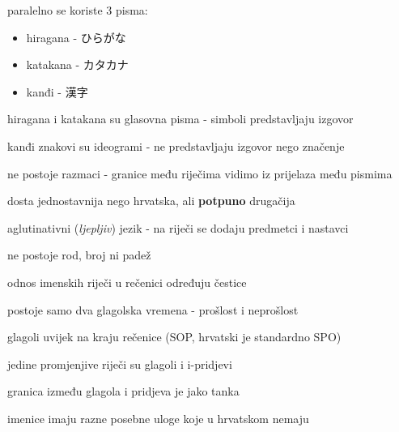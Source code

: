 	\begin{hyou}
		\item paralelno se koriste 3 pisma:
		\begin{itemize}
			\itemsep-5pt
			\item hiragana - ひらがな
			\item katakana - カタカナ
			\item kanđi - 漢字
		\end{itemize}
		\item hiragana i katakana su glasovna pisma - simboli predstavljaju izgovor
		\item kanđi znakovi su ideogrami - ne predstavljaju izgovor nego značenje
		\item ne postoje razmaci - granice među riječima vidimo iz prijelaza među pismima
	\end{hyou}

	\fukudai{Gramatika}
	\begin{hyou}
		\item dosta jednostavnija nego hrvatska, ali \textbf{potpuno} drugačija
		\item aglutinativni (\textit{ljepljiv}) jezik - na riječi se dodaju predmetci i nastavci
		\item ne postoje rod, broj ni padež
		\item odnos imenskih riječi u rečenici određuju čestice
		\item postoje samo dva glagolska vremena - prošlost i neprošlost
		\item glagoli uvijek na kraju rečenice (SOP, hrvatski je standardno SPO)
		\item jedine promjenjive riječi su glagoli i i-pridjevi
		\item granica između glagola i pridjeva je jako tanka
		\item imenice imaju razne posebne uloge koje u hrvatskom nemaju
	\end{hyou}

